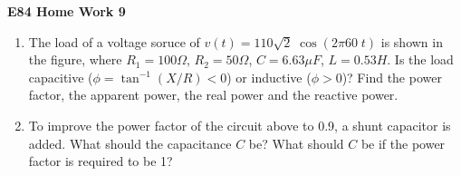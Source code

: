 \usepackage{html}

\begin{center}
{\Large \bf E84 Home Work 9}
\end{center}
\begin{enumerate}

\item The load of a voltage soruce of $v(t)=110\sqrt{2} \;\cos(2\pi 60\;t)$
is shown in the figure, where $R_1=100\Omega$, $R_2=50\Omega$, $C=6.63\mu F$, 
$L=0.53 H$. Is the load capacitive ($\phi=\tan^{-1}(X/R)<0$) or inductive 
($\phi>0$)? Find the power factor, the apparent power, the real power and 
the reactive power. 


%   

\item To improve the power factor of the circuit above to 0.9, a shunt 
capacitor is added. What should the capacitance $C$ be? What should $C$ be 
if the power factor is required to be 1?


%  


\end{enumerate}

